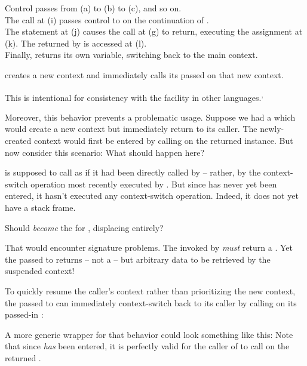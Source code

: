 
Control passes from (a) to (b) to (c), and so on.\\
The  call at (i) passes control
to  on the continuation of .\\
The  statement at (j) causes the \resume call at (g) to return,
executing the assignment at (k). The  returned by  is
accessed at (l).\\
Finally,  returns its own  variable, switching back to the main
context.



\callcc creates a new context and immediately calls its passed \entryfn on
that new context.

This is intentional for consistency with the \cc facility in other
languages.\cite{schemecallcc}\textsuperscript{,}\cite{rubycallcc}

Moreover, this behavior prevents a problematic usage. Suppose we had
a  which would create a new context but immediately
return to its caller. The newly-created context would first be entered by
calling \resume on the returned \cont instance.
But now consider this scenario:
What should happen here?

\resumewith is supposed to call  as if it had been
directly called by  -- rather, by the context-switch
operation most recently executed by . But
since  has never yet been entered, it hasn't executed
any context-switch operation. Indeed, it does not yet have a stack frame.

Should  \emph{become} the \entryfn
for , displacing  entirely?

That would encounter signature problems. The \entryfn invoked
by \callcc \emph{must} return a \cont. Yet the  passed to \resumewith
returns -- not a \cont -- but arbitrary data to be retrieved by the suspended
context!

To quickly resume the caller's context rather than prioritizing the new
context, the \entryfn passed to \callcc can immediately context-switch back
to its caller by calling \resume on its passed-in \cont:

A more generic wrapper for that behavior could look something like this:
Note that since  \emph{has} been entered, it
is perfectly valid for the caller of  to
call \resumewith on the returned \cont.

